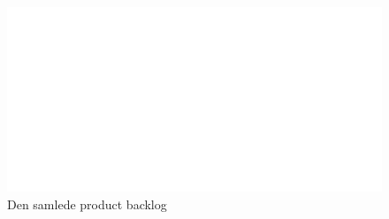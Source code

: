 \documentclass[12pt, a4paper]{report}
\begin{document}
\begin{figure}[ht]
\includegraphics[width=\textwidth]{backlog}
\caption{Den samlede product backlog}
\label{backlog}
\end{figure}
\end{document}

